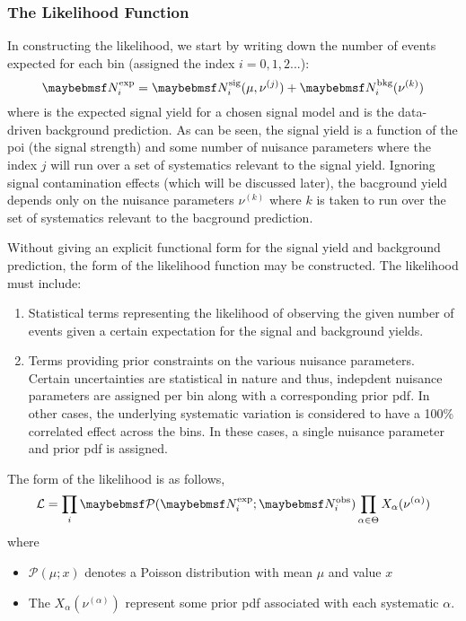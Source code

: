 \subsubsection{The Likelihood Function}
In constructing the likelihood, we start by writing down the number of events
expected for each bin (assigned the index $i=0,1,2...$):
\begin{equation}
\NExpi = \NSigi(\mu, \nu^{(j)}) +
\NBkgi(\nu^{(k)}) \\
\end{equation}
where \NSigi is the expected signal yield for a chosen
signal model and \NBkgi is the data-driven background
prediction. As can be seen, the signal yield is a function of the \ac{poi} (the
signal strength) and some number of nuisance parameters where the index $j$
will run over a set of systematics relevant to the signal yield. Ignoring
signal contamination effects (which will be discussed later), the bacground
yield depends only on the nuisance parameters $\nu^{(k)}$ where $k$ is taken to run
over the set of systematics relevant to the bacground prediction.

Without giving an explicit functional form for the signal yield and background
prediction, the form of the likelihood function may be constructed. The
likelihood must include:
\begin{enumerate}
\item Statistical terms representing the likelihood of observing the given
  number of events given a certain expectation for the signal and background
  yields.
\item Terms providing prior constraints on the various nuisance
  parameters. Certain uncertainties are statistical in nature and thus,
  indepdent nuisance parameters are assigned per bin along with a corresponding
  prior pdf. In other cases, the underlying systematic variation is considered
  to have a 100\% correlated effect across the bins. In these cases, a single
  nuisance parameter and prior pdf is assigned.
\end{enumerate}

The form of the likelihood is as follows,
\begin{equation}
\mathcal{L} = \prod_i \Poisson(\NExpi ; \NObsi)
\prod_{\alpha \in \Theta}  X_\alpha(\nu^{(\alpha)})
\end{equation}
where
\begin{itemize}
\item $\mathcal{P}(\mu;x)$ denotes a Poisson distribution with mean $\mu$ and value
$x$
\item The $X_\alpha(\nu^{(\alpha)})$ represent some prior pdf associated with
  each systematic $\alpha$.
\end{itemize}

